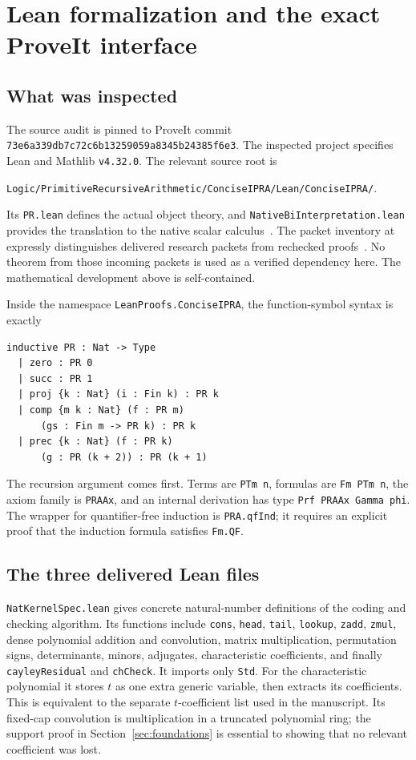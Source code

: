 \section{Lean formalization and the exact ProveIt interface}
\label{sec:lean}

\subsection{What was inspected}

The source audit is pinned to ProveIt commit
\texttt{73e6a339db7c72c6b13259059a8345b24385f6e3}.
The inspected project specifies Lean and Mathlib \texttt{v4.32.0}.
The relevant source root is
\begin{center}
\small\texttt{Logic/PrimitiveRecursiveArithmetic/ConciseIPRA/Lean/ConciseIPRA/}.
\end{center}
Its \texttt{PR.lean} defines the actual object theory, and
\texttt{NativeBiInterpretation.lean} provides the translation to the
native scalar calculus~\cite{proveit-pr,proveit-native}.
The packet inventory at
expressly distinguishes delivered research packets from rechecked
proofs~\cite{proveit-packets}. No theorem from those incoming packets is
used as a verified dependency here. The mathematical development above
is self-contained.

Inside the namespace \texttt{LeanProofs.ConciseIPRA}, the function-symbol
syntax is exactly
\begin{lstlisting}
inductive PR : Nat -> Type
  | zero : PR 0
  | succ : PR 1
  | proj {k : Nat} (i : Fin k) : PR k
  | comp {m k : Nat} (f : PR m)
      (gs : Fin m -> PR k) : PR k
  | prec {k : Nat} (f : PR k)
      (g : PR (k + 2)) : PR (k + 1)
\end{lstlisting}
The recursion argument comes first. Terms are \texttt{PTm n}, formulas
are \texttt{Fm PTm n}, the axiom family is \texttt{PRAAx}, and an internal
derivation has type \texttt{Prf PRAAx Gamma phi}. The wrapper for
quantifier-free induction is \texttt{PRA.qfInd}; it requires an explicit
proof that the induction formula satisfies \texttt{Fm.QF}.

\subsection{The three delivered Lean files}

\texttt{NatKernelSpec.lean} gives concrete natural-number definitions of
the coding and checking algorithm. Its functions include
\texttt{cons}, \texttt{head}, \texttt{tail}, \texttt{lookup},
\texttt{zadd}, \texttt{zmul}, dense polynomial addition and convolution,
matrix multiplication, permutation signs, determinants, minors,
adjugates, characteristic coefficients, and finally
\texttt{cayleyResidual} and \texttt{chCheck}. It imports only
\texttt{Std}. For the characteristic polynomial it stores $t$ as one
extra generic variable, then extracts its coefficients. This is
equivalent to the separate $t$-coefficient list used in the manuscript.
Its fixed-cap convolution is multiplication in a truncated polynomial
ring; the support proof in Section~\ref{sec:foundations} is essential
to showing that no relevant coefficient was lost.

